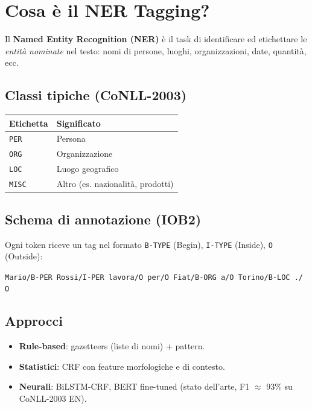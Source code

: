 \documentclass[12pt,a4paper]{article}
\begin{document}
\section{Cosa è il NER Tagging?}

Il \textbf{Named Entity Recognition (NER)} è il task di identificare ed etichettare le \emph{entità nominate} nel testo: nomi di persone, luoghi, organizzazioni, date, quantità, ecc.

\subsection{Classi tipiche (CoNLL-2003)}
\begin{center}
\begin{tabular}{ll}
\toprule
\textbf{Etichetta} & \textbf{Significato} \\
\midrule
\texttt{PER} & Persona \\
\texttt{ORG} & Organizzazione \\
\texttt{LOC} & Luogo geografico \\
\texttt{MISC} & Altro (es. nazionalità, prodotti) \\
\bottomrule
\end{tabular}
\end{center}

\subsection{Schema di annotazione (IOB2)}
Ogni token riceve un tag nel formato \texttt{B-TYPE} (Begin), \texttt{I-TYPE} (Inside), \texttt{O} (Outside):
\begin{center}
\texttt{Mario/B-PER Rossi/I-PER lavora/O per/O Fiat/B-ORG a/O Torino/B-LOC ./ O}
\end{center}

\subsection{Approcci}
\begin{itemize}[leftmargin=1.5em]
  \item \textbf{Rule-based}: gazetteers (liste di nomi) + pattern.
  \item \textbf{Statistici}: CRF con feature morfologiche e di contesto.
  \item \textbf{Neurali}: BiLSTM-CRF, BERT fine-tuned (stato dell'arte, F1 $\approx$ 93\% su CoNLL-2003 EN).
\end{itemize}
\end{document}
